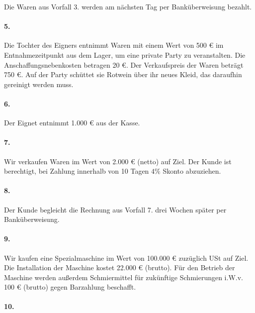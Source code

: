 \documentclass[paper=a4, fontsize=11pt]{scrartcl}
\numberwithin{equation}{section}
\numberwithin{figure}{section}
\numberwithin{table}{section}
\begin{document}
{Die Waren aus Vorfall 3. werden am nächsten Tag per Banküberweisung bezahlt. \\

\paragraph{5.}

Die Tochter des Eigners entnimmt Waren mit einem Wert von 500 € im Entnahmezeitpunkt aus dem Lager, um eine private Party zu veranstalten. Die Anschaffungsnebenkosten betragen 20 €.  Der Verkaufspreis der Waren beträgt 750 €. Auf der Party schüttet sie Rotwein über ihr neues Kleid, das daraufhin gereinigt werden muss. \\

\paragraph{6.}

Der Eignet entnimmt 1.000 € aus der Kasse. \\

\paragraph{7.}

Wir verkaufen Waren im Wert von 2.000 € (netto) auf Ziel. Der Kunde ist berechtigt, bei Zahlung innerhalb von 10 Tagen $4 \%$ Skonto abzuziehen. \\

\paragraph{8.}

Der Kunde begleicht die Rechnung aus Vorfall 7. drei Wochen später per Banküberweisung. \\

\paragraph{9.}

Wir kaufen eine Spezialmaschine im Wert von 100.000 € zuzüglich USt auf Ziel. Die Installation der Maschine kostet 22.000 € (brutto). Für den Betrieb der Maschine werden außerdem Schmiermittel für zukünftige Schmierungen i.W.v. 100 € (brutto) gegen Barzahlung beschafft. \\

\paragraph{10.}

}
\end{document}
